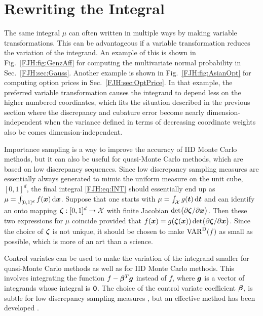 \documentclass[graybox,footinfo]{svmult}
\DeclareMathOperator{\Var}{VAR}
\begin{document}
\begin{FJHLesson}
	\FJHLessonEight
\end{FJHLesson}

\section{Rewriting the Integral}

The same integral $\mu$ can often written in multiple ways by making variable 
transformations.  This can be advantageous if a variable transformation reduces the 
variation of the integrand.  An example of this is shown in Fig.\ \ref{FJH:fig:GenzAff} for 
computing the multivariate normal probability in Sec.\ \ref{FJH:sec:Gauss}.  Another 
example is shown in Fig.\ \ref{FJH:fig:AsianOpt} for computing option prices  in Sec.\ 
\ref{FJH:sec:OptPrice}.  In that example, the preferred variable transformation causes 
the integrand to depend less on the higher numbered coordinates, which fits the situation 
described in the previous section where the discrepancy and cubature error become 
nearly dimension-independent when the variance defined in terms of decreasing 
coordinate weights also be comes dimension-independent.

Importance sampling is a way to improve the accuracy of IID Monte Carlo 
methods, but it can also be useful for quasi-Monte Carlo methods, which are based on 
low discrepancy sequences.  Since low discrepancy sampling measures are essentially 
always generated to mimic the uniform measure on the unit cube, $[0,1]^d$, the final 
integral \eqref{FJH:eq:INT} should essentially end up as $\mu = \int_{[0,1]^{d}} f({\boldsymbol{x}}) \, 
\mathrm{d}{\boldsymbol{x}}$.  Suppose that one starts with $\mu = \int_{{\mathcal{X}}} g({\boldsymbol{t}}) \, 
\mathrm{d}{\boldsymbol{t}}$ and can identify an onto mapping ${\boldsymbol{\zeta}}: [0,1]^d \to {\mathcal{X}}$ with finite
Jacobian $\det\bigl( \partial {\boldsymbol{\zeta}}/\partial {\boldsymbol{x}}\bigr)$.  Then these two expressions for 
$\mu$ coincide provided that $f({\boldsymbol{x}}) = g({\boldsymbol{\zeta}}({\boldsymbol{x}})) \det\bigl( \partial 
{\boldsymbol{\zeta}}/\partial {\boldsymbol{x}}\bigr)$.  Since the choice of ${\boldsymbol{\zeta}}$ is not unique, it should be 
chosen to make $\Var^\Dt(f)$ as small as possible, which is more of an art than a 
science.

Control variates can be used to make the variation of the integrand smaller for 
quasi-Monte Carlo methods as well as for IID Monte Carlo methods.  This involves 
integrating the function $f - {\boldsymbol{\beta}}^T {\boldsymbol{g}}$ instead of $f$, where ${\boldsymbol{g}}$ is a vector of 
integrands whose integral is ${\boldsymbol{0}}$.  The choice of the 
control variate coefficient ${\boldsymbol{\beta}}$, is subtle for low discrepancy sampling measures 
\cite{HicEtal03}, but an effective method has been 
developed \cite{HicEtal17a}.
\end{document}

